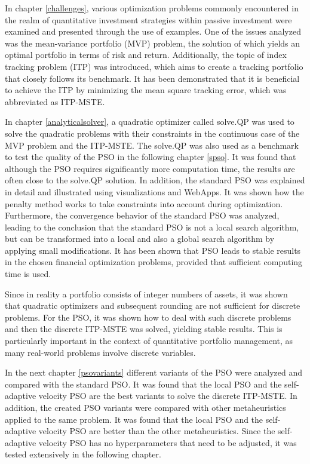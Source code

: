 \documentclass[
  oneside, a4paper, 12pt, openany]{book}
\theoremstyle{definition}
\theoremstyle{definition}
\theoremstyle{definition}
\theoremstyle{definition}
\theoremstyle{remark}
\begin{document}
In chapter \ref{challenges}, various optimization problems commonly encountered in the realm of quantitative investment strategies within passive investment were examined and presented through the use of examples. One of the issues analyzed was the mean-variance portfolio (MVP) problem, the solution of which yields an optimal portfolio in terms of risk and return. Additionally, the topic of index tracking problem (ITP) was introduced, which aims to create a tracking portfolio that closely follows its benchmark. It has been demonstrated that it is beneficial to achieve the ITP by minimizing the mean square tracking error, which was abbreviated as ITP-MSTE.

In chapter \ref{analyticalsolver}, a quadratic optimizer called solve.QP was used to solve the quadratic problems with their constraints in the continuous case of the MVP problem and the ITP-MSTE. The solve.QP was also used as a benchmark to test the quality of the PSO in the following chapter \ref{spso}. It was found that although the PSO requires significantly more computation time, the results are often close to the solve.QP solution. In addition, the standard PSO was explained in detail and illustrated using visualizations and WebApps. It was shown how the penalty method works to take constraints into account during optimization. Furthermore, the convergence behavior of the standard PSO was analyzed, leading to the conclusion that the standard PSO is not a local search algorithm, but can be transformed into a local and also a global search algorithm by applying small modifications. It has been shown that PSO leads to stable results in the chosen financial optimization problems, provided that sufficient computing time is used.

Since in reality a portfolio consists of integer numbers of assets, it was shown that quadratic optimizers and subsequent rounding are not sufficient for discrete problems. For the PSO, it was shown how to deal with such discrete problems and then the discrete ITP-MSTE was solved, yielding stable results. This is particularly important in the context of quantitative portfolio management, as many real-world problems involve discrete variables.

In the next chapter \ref{psovariants} different variants of the PSO were analyzed and compared with the standard PSO. It was found that the local PSO and the self-adaptive velocity PSO are the best variants to solve the discrete ITP-MSTE. In addition, the created PSO variants were compared with other metaheuristics applied to the same problem. It was found that the local PSO and the self-adaptive velocity PSO are better than the other metaheuristics. Since the self-adaptive velocity PSO has no hyperparameters that need to be adjusted, it was tested extensively in the following chapter.
\end{document}
